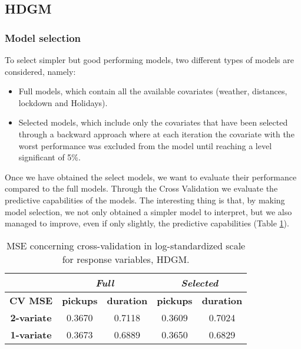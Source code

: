 \subsection{HDGM}
\subsubsection{Model selection} To select simpler but good performing models, two different types of models are considered, namely:
\begin{itemize}
	\item Full models, which contain all the available covariates (weather, distances, lockdown and Holidays).
	\item Selected models, which include only the covariates that have been selected through a backward approach where at each iteration the covariate with the worst performance was excluded from the model until reaching a level significant of \num{5}\%.
\end{itemize}
Once we have obtained the select models, we want to evaluate their performance compared to the full models. Through the Cross Validation we evaluate the predictive capabilities of the models. The interesting thing is that, by making model selection, we not only obtained a simpler model to interpret, but we also managed to improve, even if only slightly, the predictive capabilities (Table \ref{Cross-validation mean squared errors HDGM}).
 
\begin{table}
	\centering
	\renewcommand\arraystretch{1.3}
	\begin{tabular}{c|cc|cc}
		\hline
		\multicolumn{1}{l|}{} & \multicolumn{2}{c|}{\textit{Full}} & \multicolumn{2}{c}{\textit{Selected} }\\ 
		\hline
		\textbf{CV MSE} & \multicolumn{1}{c|}{\textbf{pickups }} & \textbf{duration} & \multicolumn{1}{c|}{\textbf{pickups}} & \textbf{duration} \\ 
		\hline
		\textbf{2-variate } & \multicolumn{1}{c|}{0.3670}  & 0.7118   & \multicolumn{1}{c|}{0.3609}  & 0.7024   \\ 
		\hline
		\textbf{1-variate } & \multicolumn{1}{c|}{0.3673}  & 0.6889   & \multicolumn{1}{c|}{0.3650}  & 0.6829   \\ 
		\hline
	\end{tabular}
	\caption[MSE concerning cross-validation in log-standardized scale for response variables (HDGM)]{MSE concerning cross-validation in log-standardized scale for response variables, HDGM.}
	\label{Cross-validation mean squared errors HDGM}
\end{table}

